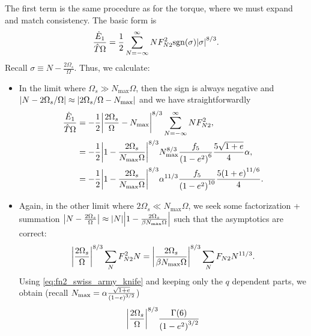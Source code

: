 \documentclass[11pt,
        usenames, %
        dvipsnames %
    ]{article}
\DeclarePairedDelimiter\abs{\lvert}{\rvert}
\DeclarePairedDelimiter\p{\lparen}{\rparen}
\begin{document}
The first term is the same procedure as for the torque, where we must expand and
match consistency. The basic form is
\begin{equation}
    \frac{\dot{E}_1}{\hat{T}\Omega} = \frac{1}{2}
        \sum\limits_{N = -\infty}^\infty NF_{N2}^2 \mathrm{sgn}(\sigma)
            \abs*{\sigma}^{8/3}.
\end{equation}
Recall $\sigma \equiv N - \frac{2\Omega_s}{\Omega}$. Thus, we calculate:
\begin{itemize}
    \item In the limit where $\Omega_s \gg N_{\max}\Omega$, then the sign is
        always negative and $\abs*{N - 2\Omega_s / \Omega} \approx
        \abs*{2\Omega_s / \Omega - N_{\max}}$ and we have straightforwardly
        \begin{align}
            \frac{\dot{E}_1}{\hat{T}\Omega}
                &= -\frac{1}{2}
                    \abs*{\frac{2\Omega_s}{\Omega} - N_{\max}}^{8/3}
                    \sum\limits_{N = -\infty}^\infty NF_{N2}^2,\\
                &= -\frac{1}{2}
                    \abs*{1 - \frac{2\Omega_s}{N_{\max}\Omega}}^{8/3}
                    N_{\max}^{8/3}
                    \frac{f_5}{\p*{1 - e^2}^6}\frac{5\sqrt{1 + e}}{4}\alpha,\\
                &= -\frac{1}{2}
                    \abs*{1 - \frac{2\Omega_s}{N_{\max}\Omega}}^{8/3}
                    \alpha^{11/3}
                    \frac{f_5}{\p*{1 - e^2}^{10}}\frac{5\p*{1 + e}^{11/6}}{4}.
        \end{align}
    \item Again, in the other limit where $2\Omega_s \ll N_{\max}\Omega$, we
        seek some factorization + summation $\abs*{N - \frac{2\Omega_s}{\Omega}}
        \approx \abs*{N}\abs*{1 - \frac{2\Omega_s}{\beta N_{\max}\Omega}}$ such
        that the asymptotics are correct:
        \begin{equation}
            \abs*{\frac{2\Omega_s}{\Omega}}^{8/3} \sum\limits_N F_{N2}^2 N
                = \abs*{\frac{2\Omega_s}{\beta N_{\max}\Omega}}^{8/3}
                    \sum\limits_N F_{N2}N^{11/3}.
        \end{equation}
        Using \autoref{eq:fn2_swiss_army_knife} and keeping only the $q$
        dependent parts, we obtain (recall $N_{\max} = \alpha \frac{\sqrt{1 +
        e}}{\p*{1 - e}^{3/2}}$)
        \begin{align}
            \abs*{\frac{2\Omega_s}{\Omega}}^{8/3} \frac{\Gamma(6)}{\p*{1 -
                    e^2}^{3/2}}

\end{align}
\end{itemize}
\end{document}
